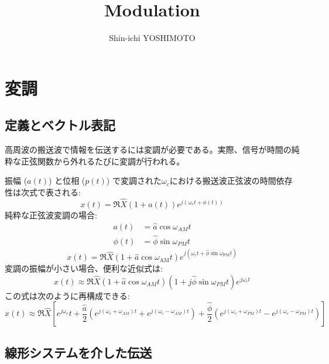 \documentclass[book]{jlreq}
\begin{document}
\title{Modulation}
\author{Shin-ichi YOSHIMOTO}
\maketitle
\tableofcontents

\chapter{変調}
\section{定義とベクトル表記}
高周波の搬送波で情報を伝送するには変調が必要である。実際、信号が時間の純粋な正弦関数から外れるたびに変調が行われる。

振幅 ($a(t)$) と位相 ($p(t)$) で変調された$\omega_c$における搬送波正弦波の時間依存性は次式で表される:
%
\begin{equation}
    x(t) = \Re{\hat{X}(1+a(t))e^{j(\omega_c t + \phi(t))}}
\end{equation}
%
純粋な正弦波変調の場合:
%
\begin{align}
    a(t)    & = \hat{a}\cos\omega_{AM}t    \\
    \phi(t) & = \hat{\phi}\sin\omega_{PM}t
\end{align}
%
\begin{equation}
    x(t) = \Re{\hat{X}(1 + \hat{a}\cos\omega_{\mathrm{AM}}t)e^{j(\omega_c t + \hat{\phi}\sin\omega_{\mathrm{PM}}t)}}
\end{equation}
%
変調の振幅が小さい場合、便利な近似式は:
%
\begin{equation}
    x(t) \approx \Re{\hat{X}(1+\hat{a}\cos\omega_{AM} t)(1+j\hat{\phi}\sin\omega_{PM} t)e^{j\omega_c t}}
\end{equation}
%
この式は次のように再構成できる:
%
\begin{equation}
    x(t) \approx \Re{\hat{X}\left[e^{j\omega_c}t
    +\frac{\hat{a}}{2}\left(e^{j(\omega_c+\omega_{AM})t}+e^{j(\omega_c-\omega_{AM})t}\right)
    +\frac{\hat{\phi}}{2}\left(e^{j(\omega_c+\omega_{PM})t}-e^{j(\omega_c-\omega_{PM})t}\right)\right]}
    \label{eq:am_pm_sig}
\end{equation}

\section{線形システムを介した伝送}
\end{document}
